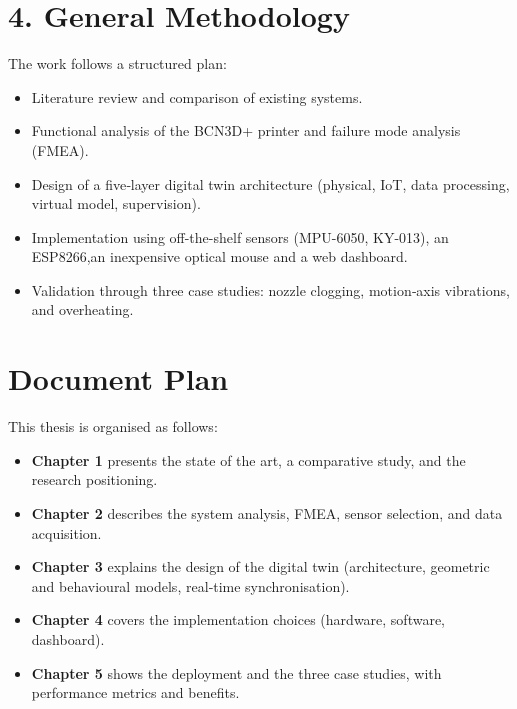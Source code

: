 \section*{4. General Methodology}
The work follows a structured plan:
\begin{itemize}
    \item Literature review and comparison of existing systems.
    \item Functional analysis of the BCN3D+ printer and failure mode analysis (FMEA).
    \item Design of a five‑layer digital twin architecture (physical, IoT, data processing, virtual model, supervision).
    \item Implementation using off-the-shelf sensors (MPU-6050, KY-013), an ESP8266,an inexpensive optical mouse and a web dashboard.
    \item Validation through three case studies: nozzle clogging, motion‑axis vibrations, and overheating.
\end{itemize}

\section*{Document Plan}
This thesis is organised as follows:
\begin{itemize}
    \item \textbf{Chapter 1} presents the state of the art, a comparative study, and the research positioning.
    \item \textbf{Chapter 2} describes the system analysis, FMEA, sensor selection, and data acquisition.
    \item \textbf{Chapter 3} explains the design of the digital twin (architecture, geometric and behavioural models, real‑time synchronisation).
    \item \textbf{Chapter 4} covers the implementation choices (hardware, software, dashboard).
    \item \textbf{Chapter 5} shows the deployment and the three case studies, with performance metrics and benefits.
\end{itemize}
